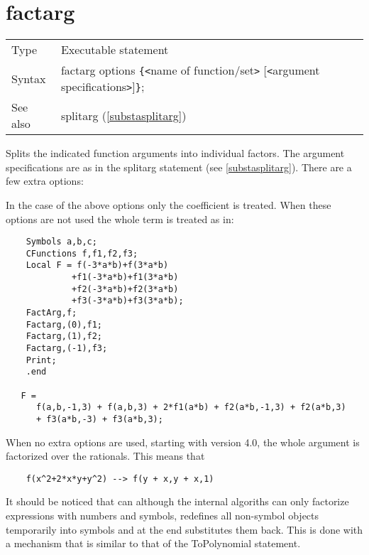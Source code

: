 
\section{factarg}
\label{substafactarg}

\noindent \begin{tabular}{ll}
Type & Executable statement\\
Syntax & factarg options \verb:{:{\tt<}name of function/set{\tt>}
                [{\tt<}argument specifications{\tt>}]\verb:}:;
\\ See also & splitarg (\ref{substasplitarg})
\end{tabular} \vspace{4mm}

\noindent Splits the indicated function arguments into individual factors. The argument specifications 
are as in the splitarg statement (see 
\ref{substasplitarg}). There are a few extra options:




\noindent In the case of the above options only the coefficient is treated. 
When these options are not used the whole term is treated as in:
\begin{verbatim}
    Symbols a,b,c;
    CFunctions f,f1,f2,f3;
    Local F = f(-3*a*b)+f(3*a*b)
             +f1(-3*a*b)+f1(3*a*b)
             +f2(-3*a*b)+f2(3*a*b)
             +f3(-3*a*b)+f3(3*a*b);
    FactArg,f;
    Factarg,(0),f1;
    Factarg,(1),f2;
    Factarg,(-1),f3;
    Print;
    .end

   F =
      f(a,b,-1,3) + f(a,b,3) + 2*f1(a*b) + f2(a*b,-1,3) + f2(a*b,3)
      + f3(a*b,-3) + f3(a*b,3);
\end{verbatim}
When no extra options are used, starting with version 4.0, the whole 
argument is factorized over the rationals. This means that
\begin{verbatim}
    f(x^2+2*x*y+y^2) --> f(y + x,y + x,1)
\end{verbatim}
It should be noticed that \FORM{} can although the internal algoriths can
only factorize expressions with numbers and symbols, \FORM{} redefines all
non-symbol objects temporarily into symbols and at the end substitutes them 
back. This is done with a mechanism that is similar to that of the 
ToPolynomial statement.

